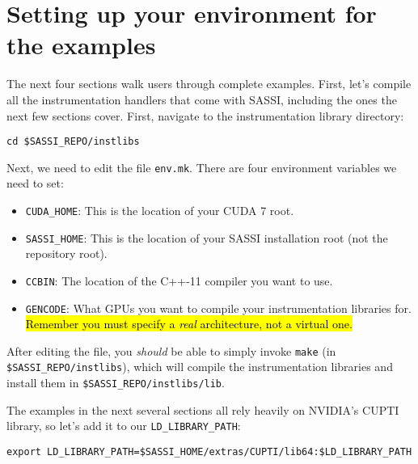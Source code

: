 \section{Setting up your environment for the examples}
\label{sec:environment}

The next four sections walk users through complete examples.  First,
let's compile all the instrumentation handlers that come with SASSI,
including the ones the next few sections cover.  First, navigate to
the instrumentation library directory:
\begin{lstlisting}[style=BashInputStyle]
cd $SASSI_REPO/instlibs
\end{lstlisting}
Next, we need to edit the file \texttt{env.mk}.  There are four
environment variables we need to set:
\begin{itemize}
\item \texttt{CUDA\_HOME}: This is the location of your CUDA 7 root.
\item \texttt{SASSI\_HOME}: This is the location of your SASSI
  installation root (not the repository root).
\item \texttt{CCBIN}: The location of the C++-11 compiler you want to
  use. 
\item \texttt{GENCODE}: What GPUs you want to compile your
  instrumentation libraries for. \hl{Remember you must specify a
    \emph{real} architecture, not a virtual one.}
\end{itemize}

After editing the file, you \emph{should} be able to simply invoke
\texttt{make} (in \texttt{\$SASSI\_REPO/instlibs}), which will compile
the instrumentation libraries and install them in
\texttt{\$SASSI\_REPO/instlibs/lib}.

The examples in the next several sections all rely heavily on NVIDIA's
CUPTI library, so let's add it to our \texttt{LD\_LIBRARY\_PATH}:
\begin{lstlisting}[style=BashInputStyle]
export LD_LIBRARY_PATH=$SASSI_HOME/extras/CUPTI/lib64:$LD_LIBRARY_PATH
\end{lstlisting}
